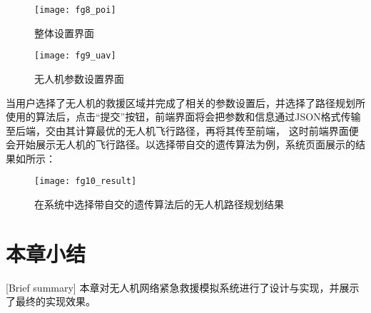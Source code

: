 \begin{figure}[H]
	\centering
	\texttt{[image: fg8\_poi]}
	\caption{整体设置界面}
	\label{fg603}
\end{figure}
\begin{figure}[H]
	\centering
	\texttt{[image: fg9\_uav]}
	\caption{无人机参数设置界面}
	\label{fg604}
\end{figure}
当用户选择了无人机的救援区域并完成了相关的参数设置后，并选择了路径规划所使用的算法后，点击“提交”按钮，前端界面将会把参数和信息通过JSON格式传输至后端，交由其计算最优的无人机飞行路径，再将其传至前端，
这时前端界面便会开始展示无人机的飞行路径。以选择带自交的遗传算法为例，系统页面展示的结果如所示：
\begin{figure}[H]
	\centering
	\texttt{[image: fg10\_result]}
	\caption{在系统中选择带自交的遗传算法后的无人机路径规划结果}
	\label{fg605}
\end{figure}
\section{本章小结}[Brief summary]
本章对无人机网络紧急救援模拟系统进行了设计与实现，并展示了最终的实现效果。